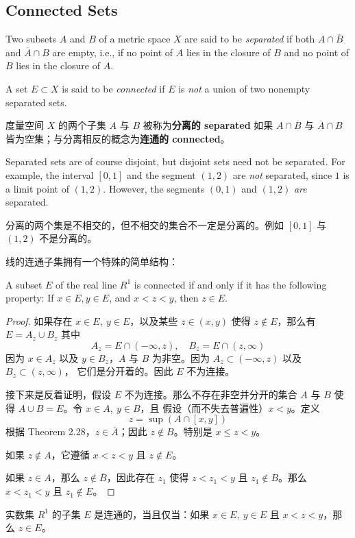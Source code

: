 \documentclass[../poma-notes.tex]{subfiles}
\begin{document}
\subsection*{Connected Sets}

\begin{definition}
  Two subsets $A$ and $B$ of a metric space $X$ are said to be \textit{separated} if both $A \cap \overline{B}$
  and $\overline{A} \cap B$ are empty, i.e., if no point of $A$ lies in the closure of $B$ and no point of $B$
  lies in the closure of $A$.

  A set $E \subset X$ is said to be \textit{connected} if $E$ is \textit{not} a union of two nonempty separated
  sets.
\end{definition}

\anote 度量空间 $X$ 的两个子集 $A$ 与 $B$ 被称为\textbf{分离的 separated} 如果 $A \cap \overline{B}$ 与
$\overline{A} \cap B$ 皆为空集；与分离相反的概念为\textbf{连通的 connected}。

\begin{remark}
  Separated sets are of course disjoint, but disjoint sets need not be separated. For example, the interval $[0,1]$
  and the segment $(1,2)$ are \textit{not} separated, since $1$ is a limit point of $(1,2)$. However, the segments
  $(0,1)$ and $(1,2)$ \textit{are} separated.
\end{remark}

\anote 分离的两个集是不相交的，但不相交的集合不一定是分离的。例如 $[0,1]$ 与 $(1,2)$ 不是分离的。

线的连通子集拥有一个特殊的简单结构：

\begin{theorem}
  A subset $E$ of the real line $R^1$ is connected if and only if it has the following property: If $x\in E, y\in E$,
  and $x<z<y$, then $z\in E$.
\end{theorem}

\begin{proof}
  如果存在 $x \in E,\ y \in E$，以及某些 $z \in (x,y)$ 使得 $z \notin E$，那么有 $E = A_z \cup B_z$ 其中
  \[A_z = E \cap (-\infty,z), \quad B_z = E \cap (z, \infty)\]
  因为 $x \in A_z$ 以及 $y \in B_z$，$A$ 与 $B$ 为非空。因为 $A_z \subset (-\infty,z)$ 以及 $B_z \subset (z,\infty)$，
  它们是分开着的。因此 $E$ 不为连接。

  接下来是反着证明，假设 $E$ 不为连接。那么不存在非空并分开的集合 $A$ 与 $B$ 使得 $A \cup B = E$。令 $x \in A,\ y \in B$，且
  假设（而不失去普遍性）$x < y$。定义
  \[z = \sup(A \cap [x, y])\]
  根据 Theorem 2.28，$z \in \overline{A}$；因此 $z \notin B$。特别是 $x \le z < y$。

  如果 $z \notin A$，它遵循 $x < z < y$ 且 $z \notin E$。

  如果 $z \in A$，那么 $z \notin \overline{B}$，因此存在 $z_1$ 使得 $z < z_1 < y$ 且 $z_1 \notin B$。那么 $x < z_1 < y$
  且 $z_1 \notin E$。
\end{proof}

\anote 实数集 $R^1$ 的子集 $E$ 是连通的，当且仅当：如果 $x \in E,\ y \in E$ 且 $x < z < y$，那么 $z \in E$。
\end{document}
